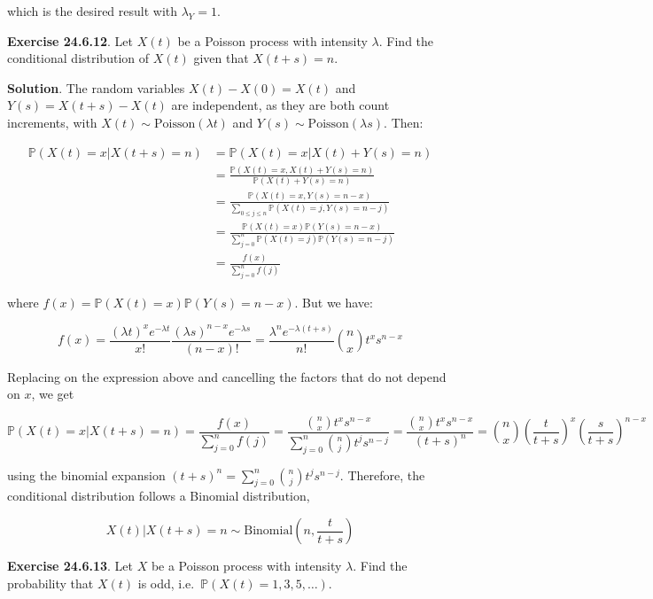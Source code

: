 which is the desired result with \(\lambda_Y = 1\).

\textbf{Exercise 24.6.12}. Let \(X(t)\) be a Poisson process with
intensity \(\lambda\). Find the conditional distribution of \(X(t)\)
given that \(X(t + s) = n\).

\textbf{Solution}. The random variables \(X(t) - X(0) = X(t)\) and
\(Y(s) = X(t + s) - X(t)\) are independent, as they are both count
increments, with \(X(t) \sim \text{Poisson}(\lambda t)\) and
\(Y(s) \sim \text{Poisson}(\lambda s)\). Then:

\begin{align*}
\mathbb{P}\left(X(t) = x | X(t + s) = n\right) &= \mathbb{P}\left(X(t) = x | X(t) + Y(s) = n\right) \\
&= \frac{\mathbb{P}\left(X(t) = x, X(t) + Y(s) = n\right)}{\mathbb{P}\left(X(t) + Y(s) = n\right)} \\
&= \frac{\mathbb{P}\left(X(t) = x, Y(s) = n - x\right)}{\sum_{0 \leq j \leq n} \mathbb{P}\left(X(t) = j, Y(s) = n - j\right)} \\
&= \frac{\mathbb{P}\left(X(t) = x\right) \mathbb{P}\left(Y(s) = n - x\right)}{\sum_{j=0}^{n} \mathbb{P}\left(X(t) = j\right) \mathbb{P}\left( Y(s) = n - j\right)} \\
&= \frac{f(x)}{\sum_{j=0}^{n} f(j) }
\end{align*}

where
\(f(x) = \mathbb{P}\left(X(t) = x\right) \mathbb{P}\left( Y(s) = n - x\right)\).
But we have:

\[ f(x) = \frac{(\lambda t)^x e^{-\lambda t}}{x!}\frac{(\lambda s)^{n - x} e^{-\lambda s}}{(n - x)!} = \frac{\lambda^{n} e^{-\lambda (t + s)}}{n!} \binom{n}{x} t^x s^{n - x} \]

Replacing on the expression above and cancelling the factors that do not
depend on \(x\), we get

\[ \mathbb{P}\left(X(t) = x | X(t + s) = n\right) = \frac{f(x)}{\sum_{j=0}^{n} f(j) } = \frac{\binom{n}{x} t^x s^{n - x}}{\sum_{j=0}^{n} \binom{n}{j} t^{j} s^{n - j}} 
= \frac{\binom{n}{x} t^x s^{n - x}}{(t + s)^{n}} = \binom{n}{x} \left( \frac{t}{t + s} \right)^x \left( \frac{s}{t + s}\right)^{n - x}\]

using the binomial expansion
\((t + s)^{n} = \sum_{j=0}^{n} \binom{n}{j} t^{j} s^{n - j}\). Therefore, the
conditional distribution follows a Binomial distribution,

\[ X(t) | X(t + s) = n \sim \text{Binomial}\left(n, \frac{t}{t + s} \right)\]

\textbf{Exercise 24.6.13}. Let \(X\) be a Poisson process with intensity
\(\lambda\). Find the probability that \(X(t)\) is odd,
i.e.~\(\mathbb{P}(X(t) = 1, 3, 5, \dots)\).

